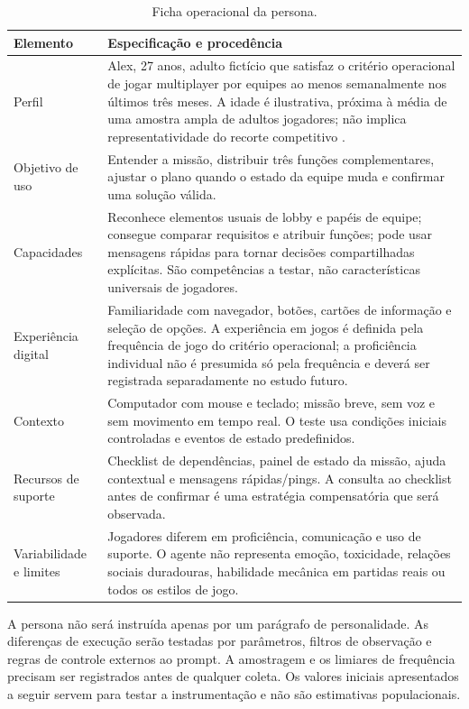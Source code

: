 \documentclass[conference]{IEEEtran}
\begin{document}
\begin{table}[!t]
\centering
\caption{Ficha operacional da persona.}
\label{tab:persona}
\scriptsize
\renewcommand{\arraystretch}{1.12}
\begin{tabularx}{\columnwidth}{@{}p{1.45cm}Y@{}}
\toprule
\textbf{Elemento} & \textbf{Especificação e procedência} \\
\midrule
Perfil & Alex, 27 anos, adulto fictício que satisfaz o critério operacional de jogar multiplayer por equipes ao menos semanalmente nos últimos três meses. A idade é ilustrativa, próxima à média de uma amostra ampla de adultos jogadores; não implica representatividade do recorte competitivo \cite{scoggins2025}. \\
Objetivo de uso & Entender a missão, distribuir três funções complementares, ajustar o plano quando o estado da equipe muda e confirmar uma solução válida. \\
Capacidades & Reconhece elementos usuais de lobby e papéis de equipe; consegue comparar requisitos e atribuir funções; pode usar mensagens rápidas para tornar decisões compartilhadas explícitas. São competências a testar, não características universais de jogadores. \\
Experiência digital & Familiaridade com navegador, botões, cartões de informação e seleção de opções. A experiência em jogos é definida pela frequência de jogo do critério operacional; a proficiência individual não é presumida só pela frequência e deverá ser registrada separadamente no estudo futuro. \\
Contexto & Computador com mouse e teclado; missão breve, sem voz e sem movimento em tempo real. O teste usa condições iniciais controladas e eventos de estado predefinidos. \\
Recursos de suporte & Checklist de dependências, painel de estado da missão, ajuda contextual e mensagens rápidas/pings. A consulta ao checklist antes de confirmar é uma estratégia compensatória que será observada. \\
Variabilidade e limites & Jogadores diferem em proficiência, comunicação e uso de suporte. O agente não representa emoção, toxicidade, relações sociais duradouras, habilidade mecânica em partidas reais ou todos os estilos de jogo. \\
\bottomrule
\end{tabularx}
\end{table}

A persona não será instruída apenas por um parágrafo de personalidade. As diferenças de execução serão testadas por parâmetros, filtros de observação e regras de controle externos ao prompt. A amostragem e os limiares de frequência precisam ser registrados antes de qualquer coleta. Os valores iniciais apresentados a seguir servem para testar a instrumentação e não são estimativas populacionais.
\end{document}
